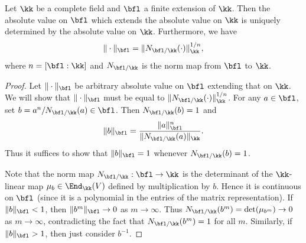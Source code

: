     \begin{theorem}\label{prop:absolute_value_on_finite_extension_of_complete_fields}
        Let \(\kk\) be a complete field and \(\bfl\) a finite extension of \(\kk\).
        Then the absolute value on \(\bfl\) which extends the absolute value on \(\kk\) is uniquely determined by the absolute value on \(\kk\).
        Furthermore, we have 
        \[ \|\cdot\|_{\bfl} = \|N_{\bfl/\kk}(\cdot)\|_{\kk}^{1/n}, \]
        where \(n = [\bfl : \kk]\) and \(N_{\bfl/\kk}\) is the norm map from \(\bfl\) to \(\kk\).
    \end{theorem}
    \begin{proof}
        Let \(\|\cdot\|_{\bfl}\) be arbitrary absolute value on \(\bfl\) extending that on \(\kk\).
        We will show that \(\|\cdot\|_{\bfl}\) must be equal to \(\|N_{\bfl/\kk}(\cdot)\|_{\kk}^{1/n}\).
        For any \(a \in \bfl\), set \(b = a^n/N_{\bfl/\kk}(a) \in \bfl\).
        Then \(N_{\bfl/\kk}(b) = 1\) and 
        \[ \|b\|_{\bfl} = \frac{\|a\|_{\bfl}^n}{\|N_{\bfl/\kk}(a)\|_{\kk}}. \]
        Thus it suffices to show that \(\|b\|_{\bfl} = 1\) whenever \(N_{\bfl/\kk}(b) = 1\).

        Note that the norm map \(N_{\bfl/\kk}: \bfl \to \kk\) is the determinant of the \(\kk\)-linear map \(\mu_b \in \End_{\kk}(V)\) defined by multiplication by \(b\).
        Hence it is continuous on \(\bfl\) (since it is a polynomial in the entries of the matrix representation).
        If \(\|b\|_{\bfl} < 1\), then \(\|b^m\|_{\bfl} \to 0\) as \(m \to \infty\).
        Thus \(N_{\bfl/\kk}(b^m) = \det(\mu_{b^m}) \to 0\) as \(m \to \infty\), contradicting the fact that \(N_{\bfl/\kk}(b^m) = 1\) for all \(m\).
        Similarly, if \(\|b\|_{\bfl} > 1\), then just consider \(b^{-1}\).
    \end{proof}

